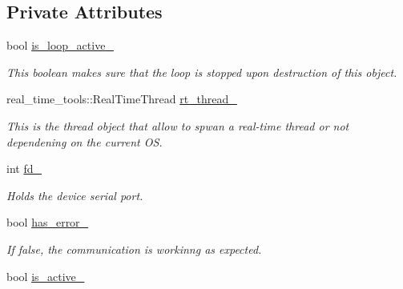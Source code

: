 \subsection*{Private Attributes}
\begin{DoxyCompactItemize}
\item 
bool \hyperlink{classblmc__drivers_1_1SerialReader_a37e1129c27b41cd9f5b4317081b217d8}{is\+\_\+loop\+\_\+active\+\_\+}\hypertarget{classblmc__drivers_1_1SerialReader_a37e1129c27b41cd9f5b4317081b217d8}{}\label{classblmc__drivers_1_1SerialReader_a37e1129c27b41cd9f5b4317081b217d8}

\begin{DoxyCompactList}\small\item\em This boolean makes sure that the loop is stopped upon destruction of this object. \end{DoxyCompactList}\item 
real\+\_\+time\+\_\+tools\+::\+Real\+Time\+Thread \hyperlink{classblmc__drivers_1_1SerialReader_a89a2a93d8a9e59738f41d8b69cb112d0}{rt\+\_\+thread\+\_\+}\hypertarget{classblmc__drivers_1_1SerialReader_a89a2a93d8a9e59738f41d8b69cb112d0}{}\label{classblmc__drivers_1_1SerialReader_a89a2a93d8a9e59738f41d8b69cb112d0}

\begin{DoxyCompactList}\small\item\em This is the thread object that allow to spwan a real-\/time thread or not dependening on the current OS. \end{DoxyCompactList}\item 
int \hyperlink{classblmc__drivers_1_1SerialReader_abf30ca34b8f61706a763a431dff68e94}{fd\+\_\+}\hypertarget{classblmc__drivers_1_1SerialReader_abf30ca34b8f61706a763a431dff68e94}{}\label{classblmc__drivers_1_1SerialReader_abf30ca34b8f61706a763a431dff68e94}

\begin{DoxyCompactList}\small\item\em Holds the device serial port. \end{DoxyCompactList}\item 
bool \hyperlink{classblmc__drivers_1_1SerialReader_abb0700e8e752917876798db18a0421db}{has\+\_\+error\+\_\+}\hypertarget{classblmc__drivers_1_1SerialReader_abb0700e8e752917876798db18a0421db}{}\label{classblmc__drivers_1_1SerialReader_abb0700e8e752917876798db18a0421db}

\begin{DoxyCompactList}\small\item\em If false, the communication is workinng as expected. \end{DoxyCompactList}\item 
bool \hyperlink{classblmc__drivers_1_1SerialReader_abf6fd962e185be25e6c61c63f8eb0cc9}{is\+\_\+active\+\_\+}\hypertarget{classblmc__drivers_1_1SerialReader_abf6fd962e185be25e6c61c63f8eb0cc9}{}\label{classblmc__drivers_1_1SerialReader_abf6fd962e185be25e6c61c63f8eb0cc9}


\end{DoxyCompactItemize}
